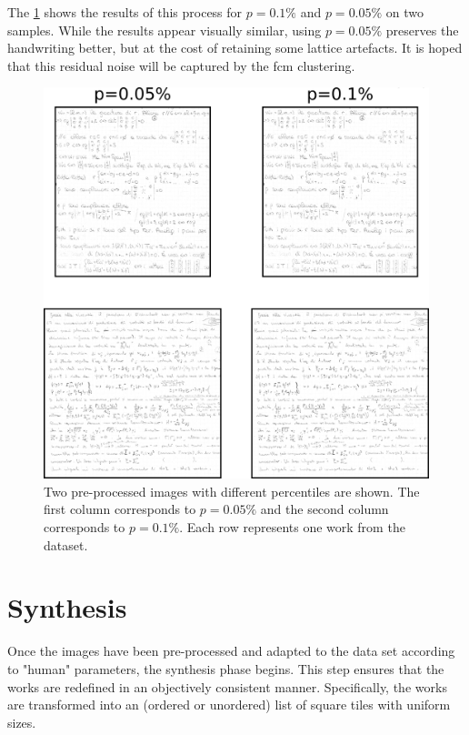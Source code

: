 \begin{toReview}
	\noindent The \cref{fig:fft_results} shows the results of this process for $p=0.1\%$ and $p=0.05\%$ on two samples. While the results appear visually similar, using $p=0.05\%$ preserves the handwriting better, but at the cost of retaining some lattice artefacts. It is hoped that this residual noise will be captured by the \gls{fcm} clustering.

	\begin{figure}[H]
		\centering \includegraphics[width=1.0\linewidth]{Figures/fft_results.png} \caption[Results of the FFT cleaning process]{Two pre-processed images with different percentiles are shown. The first column corresponds to $p=0.05\%$ and the second column corresponds to $p=0.1\%$. Each row represents one work from the dataset.} \label{fig:fft_results}
	\end{figure}

    \section{Synthesis} Once the images have been pre-processed and adapted to the data set according to "human" parameters, the synthesis phase begins. This step ensures that the works are redefined in an objectively consistent manner. Specifically, the works are transformed into an (ordered or unordered) list of square tiles with uniform sizes.


\end{toReview}
